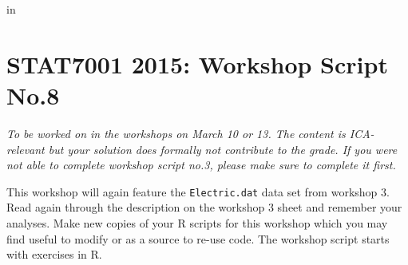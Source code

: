 
\topmargin   -3cm
\textwidth   6.2in
 in



\section*{STAT7001 2015: Workshop Script No.8}
{\em To be worked on in the workshops on March 10 or 13. The content is ICA-relevant but your solution does formally not contribute to the grade. If you were not able to complete workshop script no.3, please make sure to complete it first.}

This workshop will again feature the {\tt Electric.dat} data set from workshop 3. Read again through the description on the workshop 3 sheet and remember your analyses. Make new copies of your R scripts for this workshop which you may find useful to modify or as a source to re-use code. The workshop script starts with exercises in R.\\


